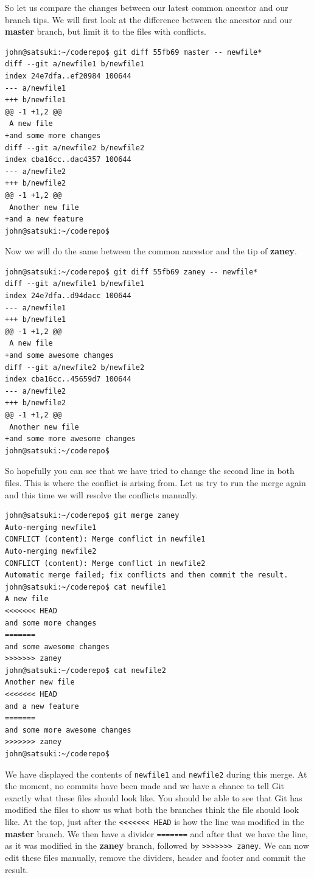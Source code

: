 So let us compare the changes between our latest common ancestor and our branch tips.  We will first look at the difference between the ancestor and our \textbf{master} branch, but limit it to the files with conflicts.

\begin{Verbatim}
john@satsuki:~/coderepo$ git diff 55fb69 master -- newfile*
diff --git a/newfile1 b/newfile1
index 24e7dfa..ef20984 100644
--- a/newfile1
+++ b/newfile1
@@ -1 +1,2 @@
 A new file
+and some more changes
diff --git a/newfile2 b/newfile2
index cba16cc..dac4357 100644
--- a/newfile2
+++ b/newfile2
@@ -1 +1,2 @@
 Another new file
+and a new feature
john@satsuki:~/coderepo$ 
\end{Verbatim}

Now we will do the same between the common ancestor and the tip of \textbf{zaney}.

\begin{Verbatim}
john@satsuki:~/coderepo$ git diff 55fb69 zaney -- newfile*
diff --git a/newfile1 b/newfile1
index 24e7dfa..d94dacc 100644
--- a/newfile1
+++ b/newfile1
@@ -1 +1,2 @@
 A new file
+and some awesome changes
diff --git a/newfile2 b/newfile2
index cba16cc..45659d7 100644
--- a/newfile2
+++ b/newfile2
@@ -1 +1,2 @@
 Another new file
+and some more awesome changes
john@satsuki:~/coderepo$ 
\end{Verbatim}

So hopefully you can see that we have tried to change the second line in both files.  This is where the conflict is arising from.  Let us try to run the merge again and this time we will resolve the conflicts manually.

\begin{Verbatim}
john@satsuki:~/coderepo$ git merge zaney
Auto-merging newfile1
CONFLICT (content): Merge conflict in newfile1
Auto-merging newfile2
CONFLICT (content): Merge conflict in newfile2
Automatic merge failed; fix conflicts and then commit the result.
john@satsuki:~/coderepo$ cat newfile1
A new file
<<<<<<< HEAD
and some more changes
=======
and some awesome changes
>>>>>>> zaney
john@satsuki:~/coderepo$ cat newfile2
Another new file
<<<<<<< HEAD
and a new feature
=======
and some more awesome changes
>>>>>>> zaney
john@satsuki:~/coderepo$ 
\end{Verbatim}

We have displayed the contents of \texttt{newfile1} and \texttt{newfile2} during this merge.  At the moment, no commits have been made and we have a chance to tell Git exactly what these files should look like.  You should be able to see that Git has modified the files to show us what both the branches think the file should look like.  At the top, just after the \texttt{<<<<<<< HEAD} is how the line was modified in the \textbf{master} branch.  We then have a divider \texttt{=======} and after that we have the line, as it was modified in the \textbf{zaney} branch, followed by \texttt{>>>>>>> zaney}.  We can now edit these files manually, remove the dividers, header and footer and commit the result.  

